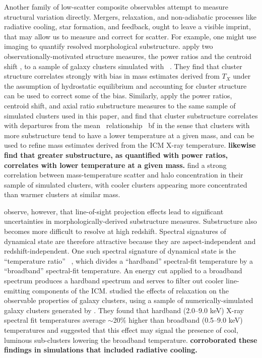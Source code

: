 \documentclass[12pt,preprint]{aastex}
\begin{document}
Another family of low-scatter composite observables attempt to measure
structural variation directly.  Mergers, relaxation, and non-adiabatic
processes like radiative cooling, star formation, and feedback, ought
to leave a visible imprint, that may allow us to measure and correct
for scatter.  For example, one might use imaging to quantify resolved
morphological substructure.  \cite{jeltema_cluster_2008} apply two
observationally-motivated structure measures, the power ratios
\citep{buote_quantifyingmorphologies_1995} and the centroid shift
\citep{mohr_x-ray_1993}, to a sample of galaxy clusters simulated with
\enzo\ \citep{norman_cosmological_1999,oshea_introducing_2004}.  They
find that cluster structure correlates strongly with bias in mass
estimates derived from $T_X$ under the assumption of hydrostatic
equilibrium and accounting for cluster structure can be used to
correct some of the bias.  Similarly,
\cite{ventimiglia_substructure_2008} apply the power ratios, centroid
shift, and axial ratio \citep{ohara_effects_2006} substructure
measures to the same sample of simulated clusters used in this paper,
and find that cluster substructure correlates with departures from the
mean \mtx\ relationship
{\, bf in the sense that clusters with more substructure tend to have a lower temperature at a given mass, }
 and can be used to refine mass estimates
derived from the ICM X-ray temperature.  
{\bf \cite{piffaretti_valdarnini_substructure_2008} likewise find that greater substructure, as quantified with power ratios, correlates with lower temperature at a given mass. }
\cite{yang_influence_2009}
find a strong correlation between mass-temperature scatter and halo
concentration in their sample of simulated clusters, with cooler
clusters appearing more concentrated than warmer clusters at similar
mass.

\cite{jeltema_cluster_2008} observe, however, that line-of-sight
projection effects lead to significant uncertainties in
morphologically-derived substructure measures.  Substructure also
becomes more difficult to resolve at high redshift.  Spectral
signatures of dynamical state are therefore attractive because they
are aspect-independent and redshift-independent.  One such spectral
signature of dynamical state is the ``temperature ratio'' \thbr\
\citep{mathiesen_four_2001,cavagnolo_bandpass_2008}, which divides a
``hardband'' spectral-fit temperature by a ``broadband'' spectral-fit
temperature.  An energy cut applied to a broadband spectrum produces a
hardband spectrum and serves to filter out cooler line-emitting
components of the ICM.  \cite{mathiesen_four_2001} studied the effects
of relaxation on the observable properties of galaxy clusters, using a
sample of numerically-simulated galaxy clusters generated by
\cite{mohr_x-ray_1997}.  They found that hardband (2.0--9.0 keV) X-ray
spectral fit temperatures average $\sim$20\% higher than broadband
(0.5--9.0 keV) temperatures and suggested that this effect may signal
the presence of cool, luminous sub-clusters lowering the broadband
temperature.  
{\bf \cite{valdarnini_substructure_2006} corroborated these findings in simulations that included radiative cooling.}
\end{document}

